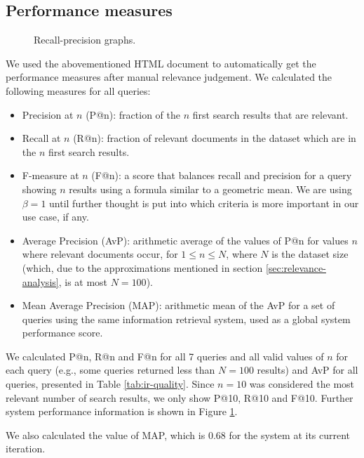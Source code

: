 \documentclass[sigconf, authorversion]{acmart}
\begin{document}
\subsection{Performance measures}

\begin{figure}[t]
    \centering
    
    
    \caption{Recall-precision graphs.} \label{fig:recall-precision-graphs}
\end{figure}

We used the abovementioned HTML document to automatically get the performance measures after manual relevance judgement. We calculated the following measures for all queries:

\begin{itemize}
    \item Precision at $n$ (P@n): fraction of the $n$ first search results that are relevant.
    \item Recall at $n$ (R@n): fraction of relevant documents in the dataset which are in the $n$ first search results.
    \item F-measure at $n$ (F@n): a score that balances recall and precision for a query showing $n$ results using a formula similar to a geometric mean. We are using $\beta=1$ until further thought is put into which criteria is more important in our use case, if any.
    \item Average Precision (AvP): arithmetic average of the values of P@n for values $n$ where relevant documents occur, for $1 \leq n \leq N$, where $N$ is the dataset size (which, due to the approximations mentioned in section \ref{sec:relevance-analysis}, is at most $N=100$).
    \item Mean Average Precision (MAP): arithmetic mean of the AvP for a set of queries using the same information retrieval system, used as a global system performance score.
\end{itemize}

We calculated P@n, R@n and F@n for all 7 queries and all valid values of $n$ for each query (e.g., some queries returned less than $N=100$ results) and AvP for all queries, presented in Table \ref{tab:ir-quality}. Since $n=10$ was considered the most relevant number of search results, we only show P@10, R@10 and F@10. Further system performance information is shown in Figure \ref{fig:recall-precision-graphs}.

We also calculated the value of MAP, which is 0.68 for the system at its current iteration.
\end{document}
